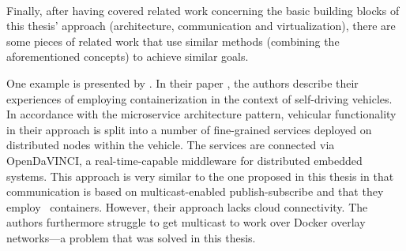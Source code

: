 
\paragraph{}
Finally, after having covered related work concerning the basic building blocks of this thesis' approach (architecture, communication and virtualization), there are some pieces of related work that use similar methods (combining the aforementioned concepts) to achieve similar goals.

One example is presented by \citeauthor*{berger2017containerized}. In their paper \cite{berger2017containerized}, the authors describe their experiences of employing containerization in the context of self-driving vehicles.
In accordance with the microservice architecture pattern, vehicular functionality in their approach is split into a number of fine-grained services deployed on distributed nodes within the vehicle. The services are connected via OpenDaVINCI, a real-time-capable middleware for distributed embedded systems. This approach is very similar to the one proposed in this thesis in that communication is based on multicast-enabled publish-subscribe and that they employ \docker\ containers. However, their approach lacks cloud connectivity. The authors furthermore struggle to get multicast to work over Docker overlay networks---a problem that was solved in this thesis.

